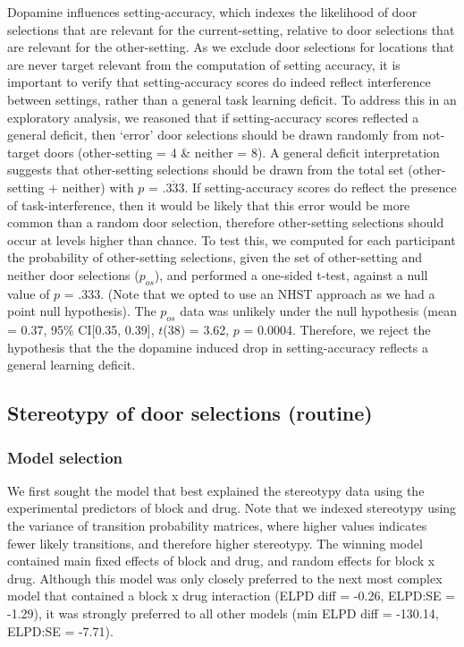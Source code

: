 \documentclass{article}
\begin{document}
Dopamine influences setting-accuracy, which indexes the likelihood of
door selections that are relevant for the current-setting, relative to
door selections that are relevant for the other-setting. As we exclude
door selections for locations that are never target relevant from the
computation of setting accuracy, it is important to verify that
setting-accuracy scores do indeed reflect interference between settings,
rather than a general task learning deficit. To address this in an
exploratory analysis, we reasoned that if setting-accuracy scores
reflected a general deficit, then `error' door selections should be
drawn randomly from not-target doors (other-setting = 4 \& neither = 8).
A general deficit interpretation suggests that other-setting selections
should be drawn from the total set (other-setting + neither) with \(p\)
= \(\overline{.333}\). If setting-accuracy scores do reflect the
presence of task-interference, then it would be likely that this error
would be more common than a random door selection, therefore
other-setting selections should occur at levels higher than chance. To
test this, we computed for each participant the probability of
other-setting selections, given the set of other-setting and neither
door selections (\(p_{os}\)), and performed a one-sided t-test, against
a null value of \(p\) = .333. (Note that we opted to use an NHST
approach as we had a point null hypothesis). The \(p_{os}\) data was
unlikely under the null hypothesis (mean = 0.37, 95\% CI{[}0.35,
0.39{]}, \(t\)(38) = 3.62, \(p\) = 0.0004. Therefore, we reject the
hypothesis that the the dopamine induced drop in setting-accuracy
reflects a general learning deficit.

\hypertarget{stereotypy-of-door-selections-routine}{%
\subsection{Stereotypy of door selections
(routine)}\label{stereotypy-of-door-selections-routine}}

\hypertarget{model-selection-2}{%
\subsubsection{Model selection}\label{model-selection-2}}

We first sought the model that best explained the stereotypy data using
the experimental predictors of block and drug. Note that we indexed
stereotypy using the variance of transition probability matrices, where
higher values indicates fewer likely transitions, and therefore higher
stereotypy. The winning model contained main fixed effects of block and
drug, and random effects for block x drug. Although this model was only
closely preferred to the next most complex model that contained a block
x drug interaction (ELPD diff = -0.26, ELPD:SE = -1.29), it was strongly
preferred to all other models (min ELPD diff = -130.14, ELPD:SE =
-7.71).
\end{document}
